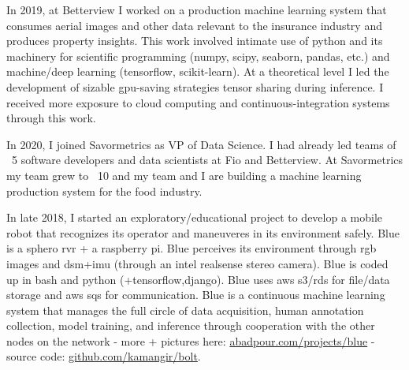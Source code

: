 \osspacing
In 2019, at Betterview I worked on a production machine learning system that consumes aerial images and other data relevant to the insurance industry and produces property insights. This work involved intimate use of python and its machinery for scientific programming (numpy, scipy, seaborn, pandas, etc.) and machine/deep learning (tensorflow, scikit-learn). At a theoretical level I led the development of sizable gpu-saving strategies tensor sharing during inference. I received more exposure to cloud computing and continuous-integration systems through this work.

\osspacing
In 2020, I joined Savormetrics as VP of Data Science. I had already led teams of ~5 software developers and data scientists at Fio and Betterview. At Savormetrics my team grew to ~10 and my team and I are building a machine learning production system for the food industry.

\osspacing
In late 2018, I started an exploratory/educational project to develop a mobile robot that recognizes its operator and maneuveres in its environment safely. Blue is a sphero rvr + a raspberry pi. Blue perceives its environment through rgb images and dsm+imu (through an intel realsense stereo camera). Blue is coded up in bash and python (+tensorflow,django). Blue uses aws s3/rds for file/data storage and aws sqs for communication. Blue is a continuous machine learning system that manages the full circle of data acquisition, human annotation collection, model training, and inference through cooperation with the other nodes on the network - more + pictures here: \href{http://abadpour.com/projects/blue}{abadpour.com/projects/blue} - source code: \href{https://github.com/kamangir/bolt}{github.com/kamangir/bolt}.

